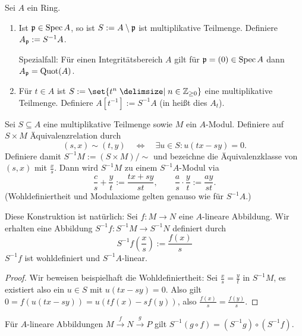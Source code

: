 \documentclass[12pt,a4paper]{scrartcl}
\theoremstyle{cplain}
\theoremstyle{cdef}
\begin{document}
\begin{bsp}
	Sei $A$ ein Ring.
	\begin{enumerate}
		\item Ist $\mathfrak{p}\in \operatorname{Spec} A$, so ist $S := A\setminus \mathfrak{p}$ ist multiplikative Teilmenge. Definiere $A_{\mathfrak{p}} := S^{-1}A$.
		
		Spezialfall: Für einen Integritätsbereich $A$ gilt für $\mathfrak{p} = (0) \in \operatorname{Spec} A$ dann $A_{\mathfrak{p}} = \operatorname{Quot}(A)$.
		\item Für $t\in A$ ist $S := \set{t^n\given n\in\IZ_{\ge 0}}$ eine multiplikative Teilmenge. Definiere $A[t^{-1}] := S^{-1}A$ (in \cite{atiyah-macdonald} heißt dies $A_t$).
	\end{enumerate}
\end{bsp}

\begin{defi}
	Sei $S\subseteq A$ eine multiplikative Teilmenge sowie $M$ ein $A$-Modul. Definiere auf $S\times M$ Äquivalenzrelation durch
	\[(s,x)\sim (t,y) \quad \Longleftrightarrow \quad \exists u\in S: u(tx-sy) =0.\]
	Definiere damit $S^{-1}M := (S\times M)/\sim$ und bezeichne die Äquivalenzklasse von $(s,x)$ mit $\frac xs$. Dann wird $S^{-1}M$ zu einem $S^{-1}A$-Modul via
	\[\frac cs +\frac yt := \frac{tx+sy}{st},\qquad \frac{a}{s}\cdot \frac{y}{t} := \frac{ay}{st}.\]
	(Wohldefiniertheit und Modulaxiome gelten genauso wie für $S^{-1}A$.)
\end{defi}

\begin{bem}
	Diese Konstruktion ist natürlich: Sei $f\colon M\to N$ eine $A$-lineare Abbildung. Wir erhalten eine Abbildung $S^{-1}f\colon S^{-1}M\to S^{-1}N$ definiert durch
	\[S^{-1}f\left(\frac{x}{s}\right) := \frac{f(x)}{s}\]
	$S^{-1}f$ ist wohldefiniert und $S^{-1}A$-linear.
	\begin{proof}
		Wir beweisen beispielhaft die Wohldefiniertheit: Sei $\frac xs = \frac yt$ in $S^{-1}M$, es existiert also ein $u\in S$ mit $u(tx-sy) = 0$. Also gilt $0 = f(u(tx-sy)) = u(tf(x)-sf(y))$, also $\frac{f(x)}{s} = \frac{f(y)}{s}$.
	\end{proof}
	Für $A$-lineare Abbildungen $M\xrightarrow{f}N\xrightarrow{g}P$ gilt $S^{-1}(g\circ f) = (S^{-1}g)\circ(S^{-1}f)$.
\end{bem}
\end{document}
